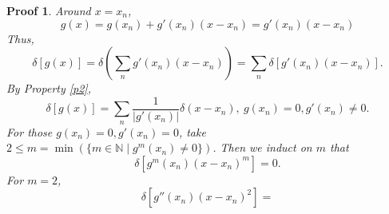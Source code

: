 \documentclass{article}
\theoremstyle{1}
\theoremstyle{2}
\newtheorem*{proof_env}{Proof}
\begin{document}
\begin{proof_env}
    Around $x=x_n$,
    \begin{equation}
        g(x)=g(x_n)+g'(x_n)(x-x_n)=g'(x_n)(x-x_n)
    \end{equation}
    Thus, 
    \begin{equation}
        \delta[g(x)]=\delta(\sum_{n}g'(x_n)(x-x_n))=\sum_{n}\delta[g'(x_n)(x-x_n)].
    \end{equation}
    By Property \ref{p2},
    \begin{equation}
        \delta[g(x)]=\sum_{n}\frac{1}{\left|g'(x_n)\right|}\delta(x-x_n),\ g(x_n)=0,g'(x_n)\not=0.
    \end{equation}
    For those $g(x_n)=0,g'(x_n)=0$, take $ 2\le m=\min\left(\{m\in \mathbb{N}\mid g^{m}(x_n)\not=0\}\right)$. Then we induct on $m$ that 
    \begin{equation}
        \delta[g^{m}(x_n)(x-x_n)^m]=0.
    \end{equation}
    For $m=2$,
    \begin{equation}
        \delta[g''(x_n)(x-x_n)^2]=
    \end{equation}
\end{proof_env}
\end{document}
